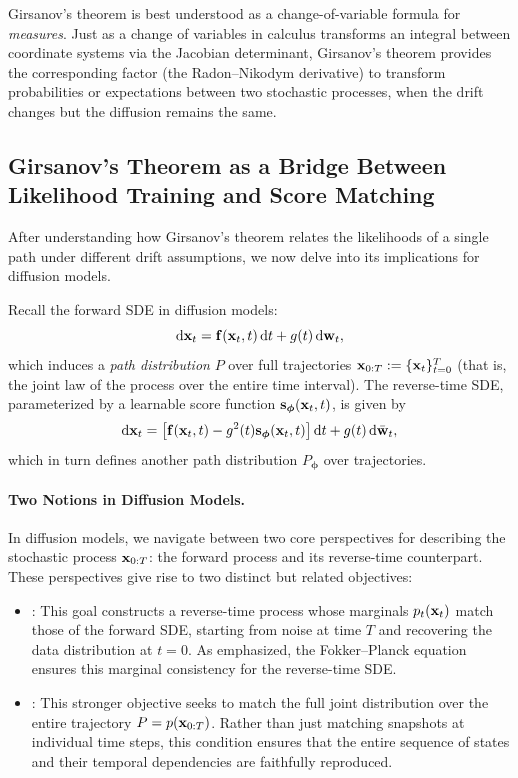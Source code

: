 Girsanov's theorem is best understood as a change-of-variable formula for \emph{measures}. Just as a change of variables in calculus transforms an integral between coordinate systems via the Jacobian determinant, Girsanov's theorem provides the corresponding factor (the Radon–Nikodym derivative) to transform probabilities or expectations between two stochastic processes, when the drift changes but the diffusion remains the same.




\subsection{Girsanov’s Theorem as a Bridge Between Likelihood Training and Score Matching}\label{subsec:girsanov}

After understanding how Girsanov's theorem relates the likelihoods of a single
path under different drift assumptions, we now delve into its implications for
diffusion models.

Recall the forward SDE in diffusion models:
\[
\mathop{}\!\mathrm{d} {\mathbf{x}}_t = {\mathbf{f}}({\mathbf{x}}_t, t) \mathop{}\!\mathrm{d} t + g(t) \mathop{}\!\mathrm{d} {\mathbf{w}}_t,
\]
which induces a \emph{path distribution} $P$ over full trajectories
${\mathbf{x}}_{0:T} := \{{\mathbf{x}}_t\}_{t=0}^T$ (that is, the joint law of the process over
the entire time interval).
The reverse-time SDE, parameterized by a learnable score function
${\mathbf{s}}_{\bm{\phi}}({\mathbf{x}}_t, t)$, is given by
\[
\mathop{}\!\mathrm{d} {\mathbf{x}}_t = \big[{\mathbf{f}}({\mathbf{x}}_t, t) - g^2(t) {\mathbf{s}}_{\bm{\phi}}({\mathbf{x}}_t, t)\big] \mathop{}\!\mathrm{d} t
+ g(t) \mathop{}\!\mathrm{d} \bar{{\mathbf{w}}}_t,
\]
which in turn defines another path distribution
$P_{\bm{\phi}}$ over trajectories.


\paragraph{Two Notions in Diffusion Models.}
In diffusion models, we navigate between two core perspectives for describing the stochastic process ${\mathbf{x}}_{0:T}$: the forward process and its reverse-time counterpart. These perspectives give rise to two distinct but related objectives:
\begin{itemize}
    \item {}: This goal constructs a reverse-time process whose marginals $p_t({\mathbf{x}}_t)$ match those of the forward SDE, starting from noise at time $T$ and recovering the data distribution at $t=0$. As emphasized, the Fokker–Planck equation ensures this marginal consistency for the reverse-time SDE.
    \item {}: This stronger objective seeks to match the full joint distribution over the entire trajectory $P = p({\mathbf{x}}_{0:T})$. Rather than just matching snapshots at individual time steps, this condition ensures that the entire sequence of states and their temporal dependencies are faithfully reproduced.
\end{itemize}

